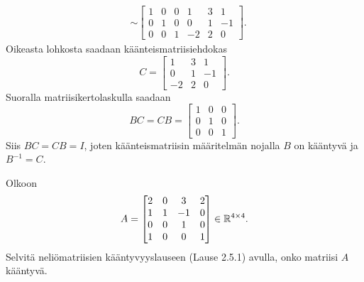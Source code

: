 \documentclass[11pt,a4paper]{amsart}
\begin{document}
\begin{solution}
\begin{enumerate}[label=(\alph*), leftmargin=*]
\[\begin{aligned}
          &\sim{}
          \left[
            \begin{array}{rrr|rrr}
              1 & 0 & 0 & 1 & 3 & 1 \\
              0 & 1 & 0 & 0 & 1 & -1 \\
              0 & 0 & 1 & -2 & 2 & 0
            \end{array}
          \right].
        \end{aligned}
      \]
      Oikeasta lohkosta saadaan käänteismatriisiehdokas
      \[
        C =
        \begin{bmatrix}
          1 & 3 & 1 \\
          0 & 1 & -1 \\
          -2 & 2 & 0
        \end{bmatrix}.
      \]
      Suoralla matriisikertolaskulla saadaan
      \[
        BC=CB=
        \begin{bmatrix}
          1 & 0 & 0 \\
          0 & 1 & 0 \\
          0 & 0 & 1
        \end{bmatrix}.
      \]
      Siis \(BC=CB=I\), joten käänteismatriisin määritelmän nojalla
      \(B\) on kääntyvä ja \(B^{-1}=C\).
  \end{enumerate}
\end{solution}

\begin{exercise}
  Olkoon
  \[
    A =
    \begin{bmatrix}
      2 & 0 & 3 & 2 \\
      1 & 1 & -1 & 0 \\
      0 & 0 & 1 & 0 \\
      1 & 0 & 0 & 1
    \end{bmatrix} \in \mathbb{R}^{4\times 4}.
  \]
  Selvitä neliömatriisien kääntyvyyslauseen (Lause 2.5.1) avulla, onko
  matriisi \(A\) kääntyvä.
\end{exercise}
\end{document}
